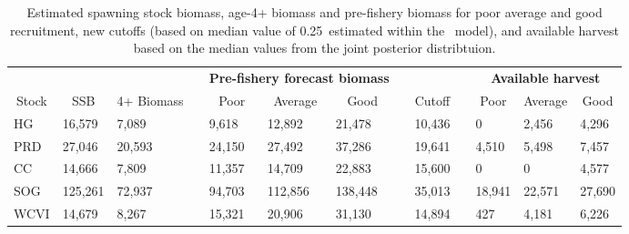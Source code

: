 %
\begin{table}[!tbp]
 \small
 \caption{Estimated spawning stock biomass,  age-4+ biomass and pre-fishery biomass for poor average and good recruitment, new cutoffs (based on median value of 0.25\bo\ estimated within the \iscam\ model), and available harvest based on the median values from the joint posterior distribtuion.\label{TableCatchAdviceNewCuttoffs}} 
 \begin{center}
 \begin{tabular}{lllclllclclll}\hline\hline
\multicolumn{3}{c}{\bfseries }&
\multicolumn{1}{c}{\bfseries }&
\multicolumn{3}{c}{\bfseries Pre-fishery forecast biomass}&
\multicolumn{1}{c}{\bfseries }&
\multicolumn{1}{c}{\bfseries }&
\multicolumn{1}{c}{\bfseries }&
\multicolumn{3}{c}{\bfseries Available harvest}
\tabularnewline \cline{1-13}
\multicolumn{1}{c}{Stock}&\multicolumn{1}{c}{SSB}&\multicolumn{1}{c}{4+ Biomass}&\multicolumn{1}{c}{}&\multicolumn{1}{c}{Poor}&\multicolumn{1}{c}{Average}&\multicolumn{1}{c}{Good}&\multicolumn{1}{c}{}&\multicolumn{1}{c}{Cutoff}&\multicolumn{1}{c}{}&\multicolumn{1}{c}{Poor}&\multicolumn{1}{c}{Average}&\multicolumn{1}{c}{Good}\tabularnewline
\hline
HG&16,579& 7,089&& 9,618&12,892&21,478&&10,436&&     0& 2,456& 4,296\tabularnewline
PRD&27,046&20,593&&24,150&27,492&37,286&&19,641&& 4,510& 5,498& 7,457\tabularnewline
CC&14,666& 7,809&&11,357&14,709&22,883&&15,600&&     0&     0& 4,577\tabularnewline
SOG&125,261& 72,937&& 94,703&112,856&138,448&& 35,013&& 18,941& 22,571& 27,690\tabularnewline
WCVI&14,679& 8,267&&15,321&20,906&31,130&&14,894&&   427& 4,181& 6,226\tabularnewline
\hline
\end{tabular}

\end{center}

\end{table}

